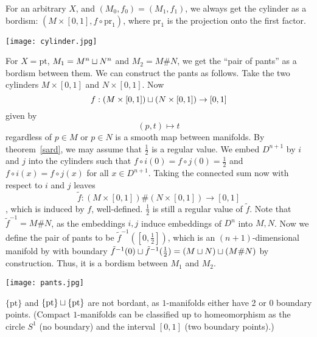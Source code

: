 \documentclass[a4paper,11pt]{article}
\begin{document}
\begin{example}[Cylinder]\label{cylinder bordism}
    For an arbitrary \(X\), and \((M_0,f_0)=(M_1,f_1)\), we always get the cylinder as a bordism: \((M\times[0,1],f\circ\mathrm{pr}_1)\), where \(\mathrm{pr}_1\) is the projection onto the first factor.
    \begin{center}
        \texttt{[image: cylinder.jpg]}
    \end{center}
\end{example}

\begin{example}\label{pants}
    For \(X=\mathrm{pt}\), \(M_1=M^n\sqcup N^n\) and \(M_2=M\# N\), we get the \enquote{pair of pants} as a bordism between them. We can construct the pants as follows. Take the two cylinders \(M\times [0,1]\) and \(N\times[0,1]\). Now \[f:(M\times[0,1])\sqcup(N\times[0,1])\to [0,1]\]
    given by
    \[(p,t)\mapsto t\] regardless of \(p\in M\) or \(p\in N\) is a smooth map between manifolds. By theorem\ \ref{sard}, we may assume that \(\frac12\) is a regular value. We embed \(D^{n+1}\) by \(i\) and \(j\) into the cylinders such that \(f\circ i(0)=f\circ j(0)=\frac12\) and \(f\circ i(x)=f\circ j(x)\) for all \(x\in D^{n+1}\). Taking the connected sum now with respect to \(i\) and \(j\) leaves \[\tilde f:(M\times[0,1])\#(N\times[0,1])\to[0,1]\], which is induced  by \(f\), well-defined. \(\frac12\) is still a regular value of \(\tilde f\). 
    Note that \(\tilde{f}^{-1}=M\#N\), as the embeddings \(i,j\) induce embeddings of \(D^n\) into \(M,N\). 
    Now we define the pair of pants to be \(\tilde{f}^{-1}([0,\frac12])\), which is an \((n+1)\)-dimensional manifold by with boundary \(\tilde f^{-1}(0)\sqcup\tilde f^{-1}(\frac12)=(M\sqcup N)\sqcup(M\#N)\) by construction. Thus, it is a bordism between \(M_1\) and \(M_2\).
    \begin{center}
        \texttt{[image: pants.jpg]}
    \end{center}
\end{example}

\begin{example}\label{points}
    \(\{\mathrm{pt}\}\) and \(\{\mathrm{pt}\}\sqcup\{\mathrm{pt}\}\) are not bordant, as \(1\)-manifolds either have 2 or 0 boundary points. (Compact \(1\)-manifolds can be classified up to homeomorphism as the circle \(S^1\) (no boundary) and the interval \([0,1]\) (two boundary points).)
\end{example}
\end{document}
